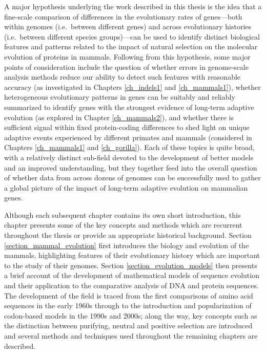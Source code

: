 A major hypothesis underlying the work described in
this thesis is the idea that a fine-scale comparison of differences in
the evolutionary rates of genes---both within genomes (i.e.\ between
different genes) and across evolutionary histories (i.e.\ between
different species groups)---can be used to identify distinct
biological features and patterns related to the impact of natural
selection on the molecular evolution of proteins in mammals. Following
from this hypothesis, some major points of consideration include the
question of whether errors in genome-scale analysis methods reduce our
ability to detect such features with reasonable accuracy (as
investigated in Chapters \ref{ch_indels1} and \ref{ch_mammals1}),
whether heterogeneous evolutionary patterns in genes can be suitably
and reliably summarized to identify genes with the strongest evidence
of long-term adaptive evolution (as explored in Chapter
\ref{ch_mammals2}), and whether there is sufficient signal within
fixed protein-coding differences to shed light on unique adaptive
events experienced by different primates and mammals (considered in
Chapters \ref{ch_mammals1} and \ref{ch_gorilla}). Each of these topics
is quite broad, with a relatively distinct sub-field devoted to the
development of better models and an improved understanding, but they
together feed into the overall question of whether data from across
dozens of genomes can be successfully used to gather a global picture
of the impact of long-term adaptive evolution on mammalian
genes. 

Although each subsequent chapter contains its own short introduction,
this chapter presents some of the key concepts and methods which are
recurrent throughout the thesis or provide an appropriate historical
background. Section \ref{section_mammal_evolution} first introduces
the biology and evolution of the mammals, highlighting features of
their evolutionary history which are important to the study of their
genomes. Section \ref{section_evolution_models} then presents a brief
account of the development of mathematical models of sequence
evolution and their application to the comparative analysis of DNA and
protein sequences. The development of the field is traced from the
first comparisons of amino acid sequences in the early 1960s through
to the introduction and popularization of codon-based models in the
1990s and 2000s; along the way, key concepts such as the distinction
between purifying, neutral and positive selection are introduced and
several methods and techniques used throughout the remaining chapters
are described.

